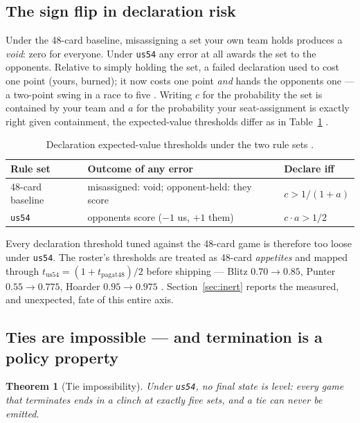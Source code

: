\documentclass[11pt]{article}
\newtheorem{theorem}{Theorem}
\newcommand{\code}[1]{\texttt{#1}}
\newcommand{\usff}{\code{us54}}
\begin{document}
\subsection{The sign flip in declaration risk}
\label{sec:signflip}

Under the 48-card baseline, misassigning a set your own team holds produces a \emph{void}:
zero for everyone. Under \usff{} any error at all awards the set to the opponents. Relative to
simply holding the set, a failed declaration used to cost one point (yours, burned); it now
costs one point \emph{and} hands the opponents one --- a two-point swing in a race to five
\cite{styles}. Writing $c$ for the probability the set is contained by your team and $a$ for
the probability your seat-assignment is exactly right given containment, the expected-value
thresholds differ as in Table~\ref{tab:ev} \cite{containment}.

\begin{table}[t]
\centering
\caption{Declaration expected-value thresholds under the two rule sets \cite{containment}.}
\label{tab:ev}
\small
\begin{tabular}{@{}lll@{}}
\toprule
Rule set & Outcome of any error & Declare iff \\
\midrule
48-card baseline & misassigned: void; opponent-held: they score & $c > 1/(1+a)$ \\
\usff{} & opponents score ($-1$ us, $+1$ them) & $c \cdot a > 1/2$ \\
\bottomrule
\end{tabular}
\end{table}

Every declaration threshold tuned against the 48-card game is therefore too loose under
\usff{}. The roster's thresholds are treated as 48-card \emph{appetites} and mapped through
$t_{\mathrm{us54}} = (1 + t_{\mathrm{pagat48}})/2$ before shipping --- Blitz $0.70 \to 0.85$,
Punter $0.55 \to 0.775$, Hoarder $0.95 \to 0.975$ \cite{styles}. Section~\ref{sec:inert}
reports the measured, and unexpected, fate of this entire axis.

\subsection{Ties are impossible --- and termination is a policy property}

\begin{theorem}[Tie impossibility]
\label{thm:tie}
Under \usff{}, no final state is level: every game that terminates ends in a clinch at
exactly five sets, and a tie can never be emitted.
\end{theorem}
\end{document}

